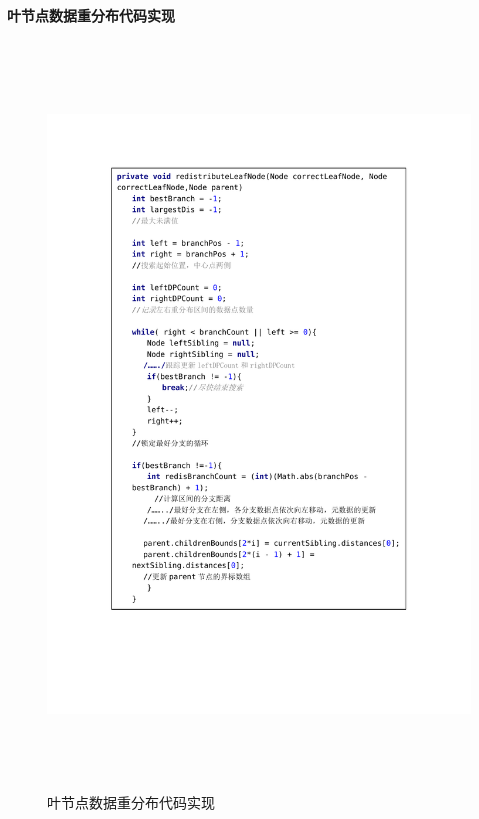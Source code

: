 \textbf{叶节点数据重分布代码实现}
\begin{figure}[H]
  \centering
  \includegraphics[width=6in,height=7.8in]{new_FIGs/chapter4/insert-code2.pdf}
  \caption{叶节点数据重分布代码实现}\label{leafnode-redistribute}
\end{figure}

